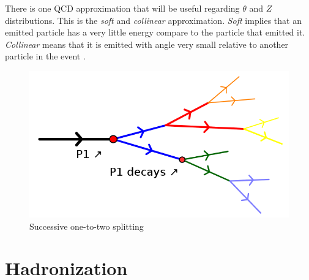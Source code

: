 There is one QCD approximation that will be useful regarding $\theta$ and $Z$ distributions. This is the \textit{soft} and \textit{collinear} approximation. \textit{Soft} implies that an emitted particle has a very little energy compare to the particle that emitted it. \textit{Collinear} means that it is emitted with angle very small relative to another particle in the event \citep{Salam:2010zt}.       
\begin{figure}
\centering
\includegraphics[scale=.3]{images/spilitting.png}
\caption{Successive one-to-two splitting}\label{fig:partonshower}
\end{figure} 
\section{Hadronization}  

